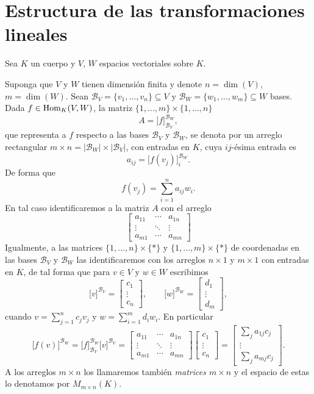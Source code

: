 \chapter{Estructura de las transformaciones lineales}

Sea $K$ un cuerpo y $V$, $W$ espacios vectoriales sobre $K$.

\begin{nota}
Suponga que $V$ y $W$ tienen dimensi\'on finita y denote $n=\dim(V)$, $m=\dim(W)$. Sean $\mathcal{B}_V=\{v_1,\ldots,v_n\}\subseteq V$ y $\mathcal{B}_W=\{w_1,\ldots,w_m\}\subseteq W$ bases. Dada $f\in\operatorname{Hom}_K(V,W)$,  la matriz $\{1,\ldots,m\}\times \{1,\ldots,n\}$
\[
A=\Big[f\Big]^{\mathcal{B}_W}_{\mathcal{B}_V},
\]
que representa a $f$ respecto a las bases $\mathcal{B}_V$ y $\mathcal{B}_W$, se denota por un arreglo rectangular $m\times n=|\mathcal{B}_W|\times|\mathcal{B}_V|$, con entradas en $K$, cuya $ij$-\'esima entrada es
\[
a_{ij}=\Big[f(v_j)\Big]^{\mathcal{B}_W}_i.
\]
De forma que
\[
f(v_j)=\sum_{i=1}^n a_{ij}w_i.
\]
En tal caso identificaremos a la matriz $A$ con el arreglo
\[
\left[\begin{array}{ccc}
a_{11} & \cdots & a_{1n}\\
\vdots & \ddots & \vdots\\
a_{m1} & \cdots & a_{mn}
\end{array}\right]
\]
Igualmente, a las matrices $\{1,\ldots,n\}\times\{*\}$ y $\{1,\ldots,m\}\times\{*\}$ de coordenadas en las bases $\mathcal{B}_V$ y $\mathcal{B}_W$ las identificaremos con los arreglos $n\times 1$ y $m\times 1$ con entradas en $K$, de tal forma que para $v\in V$ y $w\in W$ escribimos
\[
\Big[v\Big]^{\mathcal{B}_V}=\left[\begin{array}{c}
c_1\\
\vdots\\
c_n
\end{array}\right],
\qquad
\Big[w\Big]^{\mathcal{B}_W}=\left[\begin{array}{c}
d_1\\
\vdots\\
d_m
\end{array}\right],
\]
cuando $v=\sum_{j=1}^n c_jv_j$ y $w=\sum_{i=1}^m d_iw_i$. En particular
\[
\Big[f(v)\Big]^{\mathcal{B}_W}=\Big[f\Big]^{\mathcal{B}_W}_{\mathcal{B}_V}\Big[v\Big]^{\mathcal{B}_V}=
\left[\begin{array}{ccc}
a_{11} & \cdots & a_{1n}\\
\vdots & \ddots & \vdots\\
a_{m1} & \cdots & a_{mn}
\end{array}\right]
\left[\begin{array}{c}
c_1\\
\vdots\\
c_n
\end{array}\right]=
\left[\begin{array}{c}
\sum_j a_{1j}c_j\\
\vdots\\
\sum_j a_{mj}c_j
\end{array}\right].
\]
A los arreglos $m\times n$ los llamaremos tambi\'en \emph{matrices $m\times n$} y el espacio de estas lo denotamos por $M_{m\times n}(K)$. 
\end{nota}

